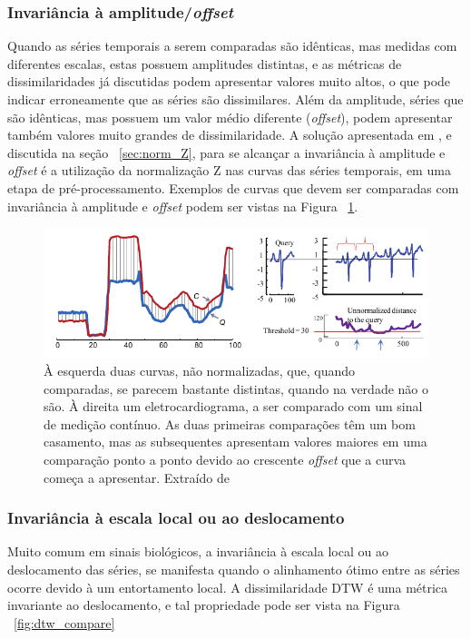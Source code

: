 \subsubsection{Invariância à amplitude/\emph{offset}}

Quando as séries temporais a serem comparadas são idênticas, mas medidas com diferentes escalas, estas possuem amplitudes distintas, e as métricas de dissimilaridades já discutidas podem apresentar valores muito altos, o que pode indicar erroneamente que as séries são dissimilares. Além da amplitude, séries que são idênticas, mas possuem um valor médio diferente (\emph{offset}), podem apresentar também valores muito grandes de dissimilaridade. A solução apresentada em \parencite{CID}, e discutida na seção ~\ref{sec:norm_Z}, para se alcançar a invariância à amplitude e \emph{offset} é a utilização da normalização Z nas curvas das séries temporais, em uma etapa de pré-processamento. Exemplos de curvas que devem ser comparadas com invariância à amplitude e \emph{offset} podem ser vistas na Figura ~\ref{fig:inv_offset_amplitude}.

\begin{figure}[h!]
	\includegraphics[width=\linewidth]{figuras/invariancias/amplitude_offset.png}
	\caption{À esquerda duas curvas, não normalizadas, que, quando comparadas, se parecem bastante distintas, quando na verdade não o são. À direita um eletrocardiograma, a ser comparado com um sinal de medição contínuo. As duas primeiras comparações têm um bom casamento, mas as subsequentes apresentam valores maiores em uma comparação ponto a ponto devido ao crescente \emph{offset} que a curva começa a apresentar. Extraído de ~\parencite{CID}}
	\label{fig:inv_offset_amplitude}
\end{figure}

\subsubsection{Invariância à escala local ou ao deslocamento}

Muito comum em sinais biológicos, a invariância à escala local ou ao deslocamento das séries, se manifesta quando o alinhamento ótimo entre as séries ocorre devido à um entortamento local. A dissimilaridade DTW é uma métrica invariante ao deslocamento, e tal propriedade pode ser vista na Figura ~\ref{fig:dtw_compare}

